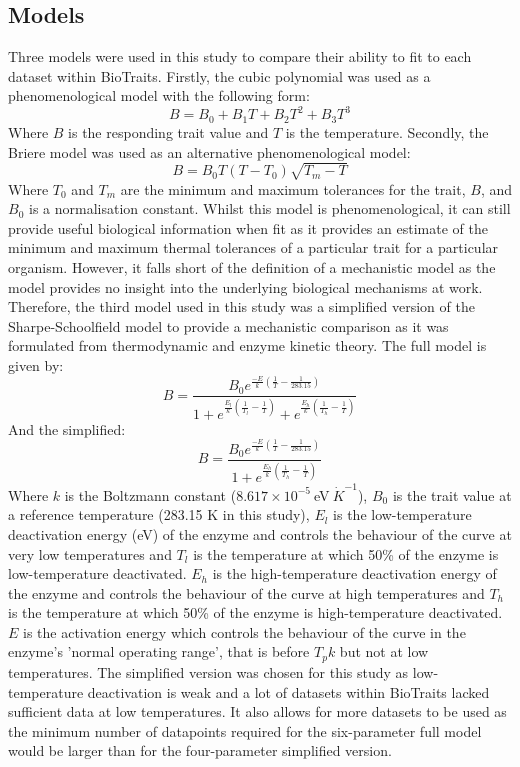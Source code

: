 \documentclass[twoside,twocolumn]{article}
\begin{document}
\subsection{Models}
Three models were used in this study to compare their ability to fit to each dataset within BioTraits.
Firstly, the cubic polynomial was used as a phenomenological model with the following form:
\begin{equation}
B = B_0 + B_1T + B_2T^2 + B_3T^3
\end{equation}
Where $B$ is the responding trait value and $T$ is the temperature.
Secondly, the Briere model \citep{Briere1999} was used as an alternative phenomenological model:
\begin{equation}
  B = B_0T(T - T_{0})\sqrt{T_{m} - T}
\end{equation}
Where $T_{0}$ and $T_{m}$ are the minimum and maximum tolerances for the trait, $B$, and $B_0$ 
is a normalisation constant. Whilst this model is phenomenological, it can still provide useful 
biological information when fit as it provides an estimate of the minimum and maximum thermal 
tolerances of a particular trait for a particular organism. However, it falls short of the definition
of a mechanistic model as the model provides no insight into the underlying biological mechanisms at work.
Therefore, the third model used in this study was a simplified version of the Sharpe-Schoolfield \citep{Schoolfield1981}
model to provide a mechanistic comparison as it was formulated from thermodynamic and enzyme 
kinetic theory. The full model is given by:
\begin{equation}
  B = \frac{B_{0}e^{\frac{-E}{k}(\frac{1}{T} - \frac{1}{283.15})}}{1 + e^{\frac{E_l}{k}(\frac{1}{T_l} - \frac{1}{T})} + e^{\frac{E_h}{k}(\frac{1}{T_h} - \frac{1}{T})}}
\end{equation}
And the simplified:
\begin{equation}
  B = \frac{B_{0}e^{\frac{-E}{k}(\frac{1}{T} - \frac{1}{283.15})}}{1 + e^{\frac{E_h}{k}(\frac{1}{T_h} - \frac{1}{T})}}
\end{equation}
Where $k$ is the Boltzmann constant ($8.617 \times 10^{-5}  \ $eV$ \ \dot K^{-1}$), $B_0$ is the trait value at a 
reference temperature (283.15 K in this study), $E_l$ is the low-temperature deactivation energy (eV) of the enzyme and controls
the behaviour of the curve at very low temperatures and $T_l$ is the temperature at which 50\% of the enzyme is low-temperature deactivated.
$E_h$ is the high-temperature deactivation energy of the enzyme and controls the behaviour of the curve at high temperatures and $T_h$ is the 
temperature at which 50\% of the enzyme is high-temperature deactivated. $E$ is the activation energy which controls the behaviour of the curve 
in the enzyme's 'normal operating range', that is before $T_pk$ but not at low temperatures. The simplified version was chosen for this study
as low-temperature deactivation is weak and a lot of datasets within BioTraits lacked sufficient data at low temperatures. It also allows for 
more datasets to be used as the minimum number of datapoints required for the six-parameter full model would be larger than for the four-parameter
simplified version.
\end{document}
